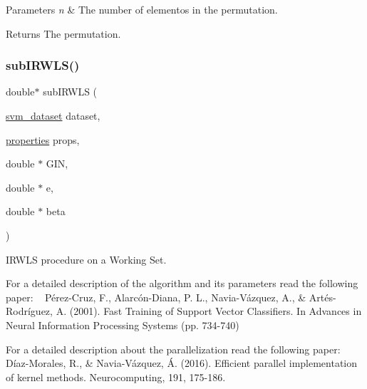 \begin{DoxyParams}{Parameters}
{\em n} & The number of elementos in the permutation. \\
\hline
\end{DoxyParams}
\begin{DoxyReturn}{Returns}
The permutation. 
\end{DoxyReturn}
\hypertarget{full-train_8h_af736cb71af5e7e4cb062977793905f4d}{}\label{full-train_8h_af736cb71af5e7e4cb062977793905f4d} 
\subsubsection{\texorpdfstring{sub\+I\+R\+W\+L\+S()}{subIRWLS()}}
{\ttfamily double$\ast$ sub\+I\+R\+W\+LS (\begin{DoxyParamCaption}\item[{\hyperlink{structsvm__dataset}{svm\+\_\+dataset}}]{dataset,  }\item[{\hyperlink{structproperties}{properties}}]{props,  }\item[{double $\ast$}]{G\+IN,  }\item[{double $\ast$}]{e,  }\item[{double $\ast$}]{beta }\end{DoxyParamCaption})}



I\+R\+W\+LS procedure on a Working Set. 

For a detailed description of the algorithm and its parameters read the following paper\+: ~\newline
 Pérez-\/\+Cruz, F., Alarcón-\/\+Diana, P. L., Navia-\/\+Vázquez, A., \& Artés-\/\+Rodríguez, A. (2001). Fast Training of Support Vector Classifiers. In Advances in Neural Information Processing Systems (pp. 734-\/740)

For a detailed description about the parallelization read the following paper\+: ~\newline
Díaz-\/\+Morales, R., \& Navia-\/\+Vázquez, Á. (2016). Efficient parallel implementation of kernel methods. Neurocomputing, 191, 175-\/186.


